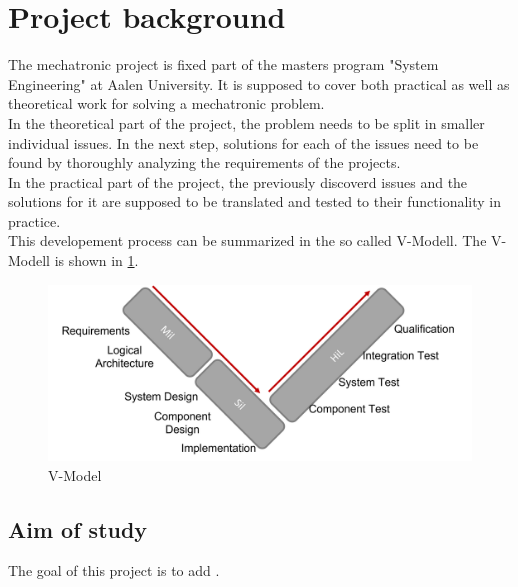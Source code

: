 \section{Project background}
The mechatronic project is fixed part of the masters program "System Engineering" at Aalen University. It is supposed to cover both practical as well as theoretical work for solving a mechatronic problem.\\
In the theoretical part of the project, the problem needs to be split in smaller individual issues. In the next step, solutions for each of the issues need to be found by thoroughly analyzing the requirements of the projects.\\
In the practical part of the project, the previously discoverd issues and the solutions for it are supposed to be translated and tested to their functionality in practice.\\
This developement process can be summarized in the so called V-Modell. The V-Modell is shown in \ref{V-Model Complete}.
\begin{figure}[h!]
    \begin{center}
    \includegraphics[width=12cm]{Pictures/VModelComplete.png}
    \caption[V-Model Complete]{V-Model}
    \label{V-Model Complete}
    \end{center}
\end{figure}

\subsection{Aim of study}
The goal of this project is to add . 



